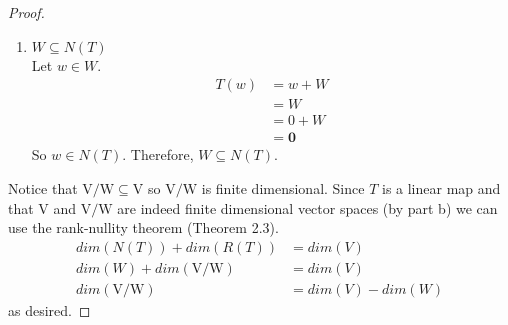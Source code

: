 \documentclass[11pt]{scrartcl}
\begin{document}
\begin{enumerate}[label=\alph*.]
{\begin{proof}
\begin{enumerate}[label=\arabic*.]
{\begin{enumerate}[label=\roman*.]
{\begin{lemma}
\begin{proof}
									\end{proof}
								  \end{lemma}
				                  Let $x \in N(T)$.\\ %
				                  By definition of $N(T)$ and using the lemma above,
				                  \begin{align*}
					                  T(x) & = \mathbf{0} \\
					                       & = 0 + W      \\
					                       & = w + W
				                  \end{align*}
				                  where $0, w \in W$ and $\mathbf{0} \in \mathrm{V}/\mathrm{W}$.\\
				                  This must mean that $x = w$ and since $w \in W$, $x \in W$. Therefore, $N(T) \subseteq W$\\
				                  }
				            \item{
				                  $W \subseteq N(T)$\\
				                  Let $w \in W$.
				                  \begin{align*}
					                  T(w) & = w + W      \\
					                       & = W          \\
					                       & = 0 + W      \\
					                       & = \mathbf{0}
				                  \end{align*}
				                  }
				                  So $w \in N(T)$. Therefore, $W \subseteq N(T)$.
			            \end{enumerate}
			            }
		      \end{enumerate}
		      Notice that $\mathrm{V}/\mathrm{W} \subseteq \mathrm{V}$
		      so $\mathrm{V}/\mathrm{W}$ is finite dimensional.
		      Since $T$ is a linear map and that $\mathrm{V}$ and $\mathrm{V}/\mathrm{W}$ are indeed finite dimensional vector spaces
		      (by part b) we can use the rank-nullity theorem (Theorem 2.3).
		      \begin{align*}
			      dim(N(T)) + dim(R(T))               & =   dim(V)        \\
			      dim(W) + dim(\mathrm{V}/\mathrm{W}) & = dim(V)          \\
			      dim(\mathrm{V}/\mathrm{W})          & = dim(V) - dim(W)
		      \end{align*}
		      as desired.
	      \end{proof}
	      }


\end{enumerate}
\end{document}
